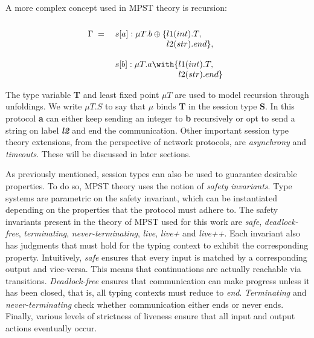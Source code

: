 A more complex concept used in MPST theory is recursion:
\begin{equation}
    \label{eqn:mpst_example_rec}
    \begin{array}{rl}
        \textbf{\ensuremath{\Gamma}} \; = \;  & s[a]:\mu T.b\ensuremath{\oplus\{}\begin{array}{@{}l}\\\ensuremath{l1(int).T,} \\ \ensuremath{l2(str).end \},}\end{array} \cr
        & s[b]:\mu T.a\ensuremath{\with\{}\begin{array}{@{}l}\\\ensuremath{l1(int).T,} \\ \ensuremath{l2(str).end \}}\end{array}
    \end{array}
\end{equation}

The type variable \textbf{T} and least fixed point \textbf{\ensuremath{\mu T}} are used to model recursion through unfoldings.
We write \textbf{\ensuremath{\mu T.S}} to say that \textbf{\ensuremath{\mu}} binds \textbf{T} in the session type \textbf{S}.
In this protocol \textbf{a} can either keep sending an integer to \textbf{b} recursively or opt to send a string on label \textbf{\textit{l2}} and end the communication.
Other important session type theory extensions, from the perspective of network protocols, are \textit{asynchrony} and \textit{timeouts}.
These will be discussed in later sections.

As previously mentioned, session types can also be used to guarantee desirable properties.
To do so, MPST theory uses the notion of \textit{safety invariants}.
Type systems are parametric on the safety invariant, which can be instantiated depending on the properties that the protocol must adhere to.
The safety invariants present in the theory of MPST used for this work are \textit{safe}, \textit{deadlock-free}, \textit{terminating}, \textit{never-terminating}, \textit{live}, \textit{live+} and \textit{live++}.
Each invariant also has judgments that must hold for the typing context to exhibit the corresponding property.
Intuitively, \textit{safe} ensures that every input is matched by a corresponding output and vice-versa.
This means that continuations are actually reachable via transitions.
\textit{Deadlock-free} ensures that communication can make progress unless it has been closed, that is, all typing contexts must reduce to \textit{end}.
\textit{Terminating} and \textit{never-terminating} check whether communication either ends or never ends.
Finally, various levels of strictness of liveness ensure that all input and output actions eventually occur.

